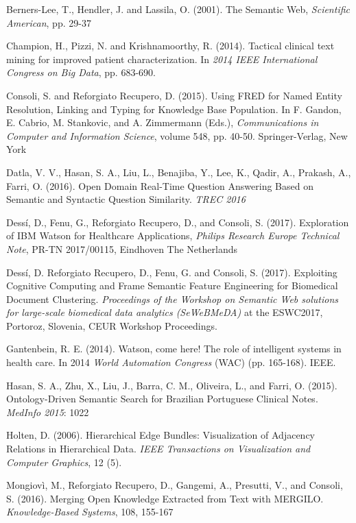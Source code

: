 \documentclass[runningheads,a4paper]{llncs}
\begin{document}
\begin{thebibliography}{4}


Berners-Lee, T., Hendler, J. and Lassila, O. (2001). The Semantic Web, {\em Scientific American}, pp. 29-37

Champion, H., Pizzi, N. and Krishnamoorthy, R. (2014). Tactical clinical text mining for improved patient characterization. In {\em 2014 IEEE International Congress on Big Data}, pp. 683-690.

Consoli, S. and Reforgiato Recupero, D. (2015). Using FRED for Named Entity Resolution, Linking and Typing for Knowledge Base Population. In F. Gandon, E. Cabrio, M. Stankovic, and A. Zimmermann (Eds.), {\em Communications in Computer and Information Science}, volume 548, pp. 40-50. Springer-Verlag, New York

Datla, V. V., Hasan, S. A., Liu, L., Benajiba, Y., Lee, K., Qadir, A., Prakash, A., Farri, O. (2016). Open Domain Real-Time Question Answering Based on Semantic and Syntactic Question Similarity. {\em TREC 2016}

Dess\'i, D., Fenu, G., Reforgiato Recupero, D., and Consoli, S. (2017). Exploration of IBM Watson for Healthcare Applications, {\em Philips Research Europe Technical Note}, PR-TN 2017/00115, Eindhoven The Netherlands

Dess\'i, D. Reforgiato Recupero, D., Fenu, G. and Consoli, S. (2017). Exploiting Cognitive Computing and Frame Semantic Feature Engineering for Biomedical Document Clustering. {\em Proceedings of the Workshop on Semantic Web solutions for large-scale biomedical data analytics (SeWeBMeDA)} at the ESWC2017, Portoroz, Slovenia, CEUR Workshop Proceedings.  

Gantenbein, R. E. (2014). Watson, come here! The role of intelligent systems in health care. In 2014 {\em World Automation Congress} (WAC) (pp. 165-168). IEEE.

Hasan, S. A., Zhu, X., Liu, J., Barra, C. M., Oliveira, L., and Farri, O. (2015). Ontology-Driven Semantic Search for Brazilian Portuguese Clinical Notes. {\em MedInfo 2015}: 1022

Holten, D. (2006). Hierarchical Edge Bundles: Visualization of Adjacency Relations in Hierarchical Data. {\em IEEE Transactions on Visualization and Computer Graphics}, 12 (5).

Mongiov\`i, M., Reforgiato Recupero, D., Gangemi, A., Presutti, V., and Consoli, S. (2016). Merging Open Knowledge Extracted from Text with MERGILO. {\em Knowledge-Based Systems}, 108, 155-167


\end{thebibliography}
\end{document}
